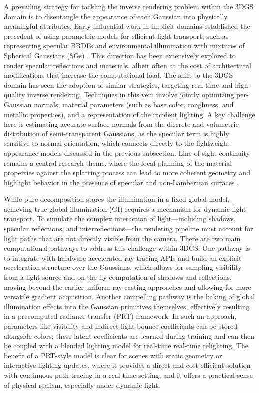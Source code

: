 \documentclass[11pt,a4paper]{article}
\begin{document}
A prevailing strategy for tackling the inverse rendering problem within the 3DGS domain is to disentangle the appearance of each Gaussian into physically meaningful attributes. Early influential work in implicit domains established the precedent of using parametric models for efficient light transport, such as representing specular BRDFs and environmental illumination with mixtures of Spherical Gaussians (SGs) \cite{arxiv:2104.00674v1}. This direction has been extensively explored to render specular reflections and materials, albeit often at the cost of architectural modifications that increase the computational load. The shift to the 3DGS domain has seen the adoption of similar strategies, targeting real-time and high-quality inverse rendering. Techniques in this vein involve jointly optimizing per-Gaussian normals, material parameters (such as base color, roughness, and metallic properties), and a representation of the incident lighting. A key challenge here is estimating accurate surface normals from the discrete and volumetric distribution of semi-transparent Gaussians, as the specular term is highly sensitive to normal orientation, which connects directly to the lightweight appearance models discussed in the previous subsection. Line-of-sight continuity remains a central research theme, where the local planning of the material properties against the splatting process can lead to more coherent geometry and highlight behavior in the presence of specular and non-Lambertian surfaces \cite{arxiv:2104.00674v1,arxiv:2401.06116v1}.

While pure decomposition stores the illumination in a fixed global model, achieving true global illumination (GI) requires a mechanism for dynamic light transport. To simulate the complex interaction of light---including shadows, specular reflections, and interreflections---the rendering pipeline must account for light paths that are not directly visible from the camera. There are two main computational pathways to address this challenge within 3DGS. One pathway is to integrate with hardware-accelerated ray-tracing APIs and build an explicit acceleration structure over the Gaussians, which allows for sampling visibility from a light source and on-the-fly computation of shadows and reflections, moving beyond the earlier uniform ray-casting approaches \cite{arxiv:1607.08659v2} and allowing for more versatile gradient acquisition. Another compelling pathway is the baking of global illumination effects into the Gaussian primitives themselves, effectively resulting in a precomputed radiance transfer (PRT) framework. In such an approach, parameters like visibility and indirect light bounce coefficients can be stored alongside colors; these latent coefficients are learned during training and can then be coupled with a blended lighting model for real-time real-time relighting. The benefit of a PRT-style model is clear for scenes with static geometry or interactive lighting updates, where it provides a direct and cost-efficient solution with continuous path tracing in a real-time setting, and it offers a practical sense of physical realism, especially under dynamic light.
\end{document}
